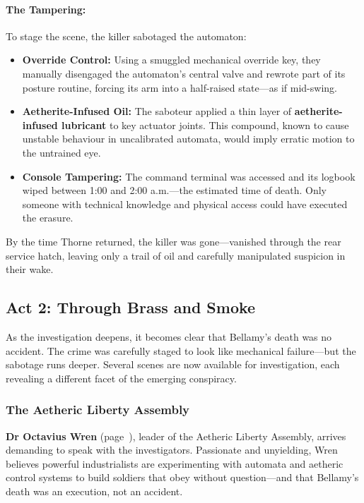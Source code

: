 \paragraph{The Tampering:}
To stage the scene, the killer sabotaged the automaton:
\begin{itemize}
    \item \textbf{Override Control:} Using a smuggled mechanical override key, they manually disengaged the automaton’s central valve and rewrote part of its posture routine, forcing its arm into a half-raised state—as if mid-swing.
    
    \item \textbf{Aetherite-Infused Oil:} The saboteur applied a thin layer of \textbf{aetherite-infused lubricant} to key actuator joints. This compound, known to cause unstable behaviour in uncalibrated automata, would imply erratic motion to the untrained eye.
    
    \item \textbf{Console Tampering:} The command terminal was accessed and its logbook wiped between 1:00 and 2:00 a.m.—the estimated time of death. Only someone with technical knowledge and physical access could have executed the erasure.
\end{itemize}

By the time Thorne returned, the killer was gone—vanished through the rear service hatch, leaving only a trail of oil and carefully manipulated suspicion in their wake.



\subsection{Act 2: Through Brass and Smoke}
As the investigation deepens, it becomes clear that Bellamy’s death was no accident. The crime was carefully staged to look like mechanical failure—but the sabotage runs deeper. Several scenes are now available for investigation, each revealing a different facet of the emerging conspiracy.

\subsubsection{The Aetheric Liberty Assembly}
\textbf{Dr Octavius Wren} (page~\pageref{npc:octavius-wren}), leader of the Aetheric Liberty Assembly, arrives demanding to speak with the investigators. Passionate and unyielding, Wren believes powerful industrialists are experimenting with automata and aetheric control systems to build soldiers that obey without question—and that Bellamy’s death was an execution, not an accident.

